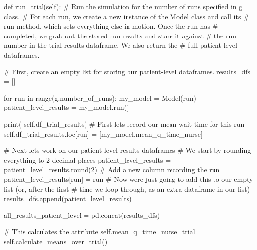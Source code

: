 \documentclass[
  letterpaper,
  DIV=11,
  numbers=noendperiod]{scrreprt}
\newenvironment{Shaded}{}{}
\newcommand{\BuiltInTok}[1]{\textcolor[rgb]{0.84,0.23,0.29}{#1}}
\newcommand{\CommentTok}[1]{\textcolor[rgb]{0.42,0.45,0.49}{#1}}
\newcommand{\ControlFlowTok}[1]{\textcolor[rgb]{0.84,0.23,0.29}{#1}}
\newcommand{\DecValTok}[1]{\textcolor[rgb]{0.00,0.36,0.77}{#1}}
\newcommand{\KeywordTok}[1]{\textcolor[rgb]{0.84,0.23,0.29}{#1}}
\newcommand{\NormalTok}[1]{\textcolor[rgb]{0.14,0.16,0.18}{#1}}
\newcommand{\OperatorTok}[1]{\textcolor[rgb]{0.14,0.16,0.18}{#1}}
\newcommand{\StringTok}[1]{\textcolor[rgb]{0.01,0.18,0.38}{#1}}
\newcommand{\VariableTok}[1]{\textcolor[rgb]{0.89,0.38,0.04}{#1}}
\begin{document}
\begin{tcolorbox}
\begin{Shaded}
\begin{Highlighting}[]
    \KeywordTok{def}\NormalTok{ run\_trial(}\VariableTok{self}\NormalTok{):}
        \CommentTok{\# Run the simulation for the number of runs specified in g class.}
        \CommentTok{\# For each run, we create a new instance of the Model class and call its}
        \CommentTok{\# run method, which sets everything else in motion.  Once the run has}
        \CommentTok{\# completed, we grab out the stored run results and store it against}
        \CommentTok{\# the run number in the trial results dataframe. We also return the}
        \CommentTok{\# full patient{-}level dataframes.}

        \CommentTok{\# First, create an empty list for storing our patient{-}level dataframes.}
\NormalTok{        results\_dfs }\OperatorTok{=}\NormalTok{ []}

        \ControlFlowTok{for}\NormalTok{ run }\KeywordTok{in} \BuiltInTok{range}\NormalTok{(g.number\_of\_runs):}
\NormalTok{            my\_model }\OperatorTok{=}\NormalTok{ Model(run)}
\NormalTok{            patient\_level\_results }\OperatorTok{=}\NormalTok{ my\_model.run()}

            \BuiltInTok{print}\NormalTok{( }\VariableTok{self}\NormalTok{.df\_trial\_results)}
            \CommentTok{\# First let\textquotesingle{}s record our mean wait time for this run}
            \VariableTok{self}\NormalTok{.df\_trial\_results.loc[run] }\OperatorTok{=}\NormalTok{ [my\_model.mean\_q\_time\_nurse]}

            \CommentTok{\# Next let\textquotesingle{}s work on our patient{-}level results dataframes}
            \CommentTok{\# We start by rounding everything to 2 decimal places}
\NormalTok{            patient\_level\_results }\OperatorTok{=}\NormalTok{ patient\_level\_results.}\BuiltInTok{round}\NormalTok{(}\DecValTok{2}\NormalTok{)}
            \CommentTok{\# Add a new column recording the run}
\NormalTok{            patient\_level\_results[}\StringTok{\textquotesingle{}run\textquotesingle{}}\NormalTok{] }\OperatorTok{=}\NormalTok{ run}
            \CommentTok{\# Now we\textquotesingle{}re just going to add this to our empty list (or, after the first}
            \CommentTok{\# time we loop through, as an extra dataframe in our list)}
\NormalTok{            results\_dfs.append(patient\_level\_results)}

\NormalTok{        all\_results\_patient\_level }\OperatorTok{=}\NormalTok{ pd.concat(results\_dfs)}

        \CommentTok{\# This calculates the attribute self.mean\_q\_time\_nurse\_trial}
        \VariableTok{self}\NormalTok{.calculate\_means\_over\_trial()}


\end{Highlighting}
\end{Shaded}
\end{tcolorbox}
\end{document}
